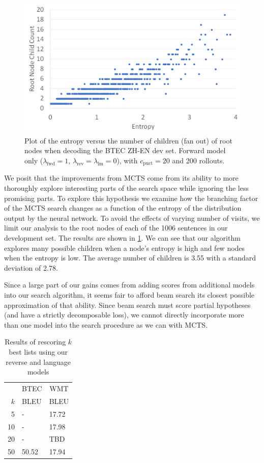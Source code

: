 \documentclass[11pt,a4paper]{article}
\begin{document}
\begin{figure}
\centering
\includegraphics[scale=0.4]{branch_entropy.png}
\caption{Plot of the entropy versus the number of children (fan out) of root
nodes when decoding the BTEC ZH-EN dev set. Forward model only
($\lambda_\text{fwd}=1$, $\lambda_\text{rev}=\lambda_\text{lm}=0$), with
$c_{\text{puct}}=20$ and 200 rollouts.}

\label{fig:entropy}
\end{figure}

We posit that the improvements from MCTS come from its ability to more
thoroughly explore interesting parts of the search space while ignoring the
less promising parts. To explore this hypothesis we examine how the branching
factor of the MCTS search changes as a function of the entropy of the
distribution output by the neural network. To avoid the effects of varying
number of visits, we limit our analysis to the root nodes of each of the 1006
sentences in our development set. The results are shown in \ref{fig:entropy}.
We can see that our algorithm explores many possible children when a node's
entropy is high and few nodes when the entropy is low. The average number of
children is 3.55 with a standard deviation of 2.78.

Since a large part of our gains comes from adding scores from additional models into our search algorithm,
it seems fair to afford beam search its closest possible approximation of that ability. Since beam search
must score partial hypotheses (and have a strictly decomposable loss), we cannot directly incorporate more than
one model into the search procedure as we can with MCTS.

\begin{table}
\centering
\begin{tabular}{r l l}
\toprule
& \multicolumn{1}{c}{BTEC} & \multicolumn{1}{c}{WMT} \\
\cmidrule(l{2pt}r{2pt}){2-2}\cmidrule(l{2pt}r{2pt}){3-3}
$k$ & BLEU & BLEU \\
\midrule
5 & - & 17.72 \\
10 & - & 17.98 \\
20 & - & TBD \\
50 & 50.52 & 17.94 \\
\bottomrule
\end{tabular}
\caption{Results of rescoring $k$ best lists using our reverse and language models}
\label{tab:rescoring}
\end{table}
\end{document}
